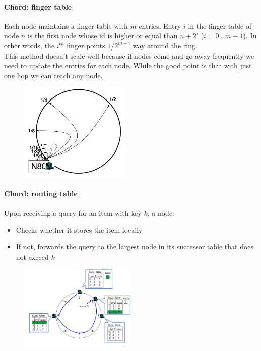 \documentclass[10pt,a4paper]{article}
\begin{document}
\paragraph{Chord: finger table}
Each node maintains a finger table with $m$ entries. Entry $i$ in the finger table of node $n$ is the first node whose id is higher or equal than $n+2^i$ ($i=0...m-1$). In other words, the $i^{th}$ finger points $1/2^{m-i}$ way around the ring.\\
This method doesn't scale well because if nodes come and go away frequently we need to update the entries for each node. While the good point is that with just one hop we can reach any node.
\begin{figure}[h!]\hfill \includegraphics[width=150pt]{images/dht-chord-finger.png}\hspace*{\fill}
  \label{fig:dht-chord-finger}
\end{figure} 
\paragraph{Chord: routing table}
Upon receiving a query for an item with key $k$, a node:
\begin{itemize}
	\item Checks whether it stores the item locally
	\item If not, forwards the query to the largest node in its successor table that does not exceed $k$
\end{itemize}
\begin{figure}[h!]\hfill \includegraphics[width=160pt]{images/dht-chord-routing.png}\hspace*{\fill}
  \label{fig:dht-chord-routing}
\end{figure} 
\end{document}
